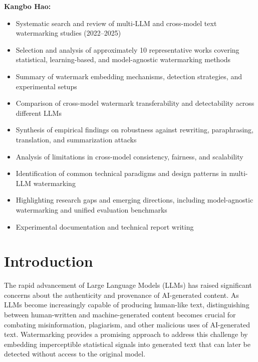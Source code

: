 \documentclass[12pt,letterpaper]{article}
\begin{document}
\vspace{0.5cm}
\noindent\textbf{Kangbo Hao:}
\begin{itemize}
    \item Systematic search and review of multi-LLM and cross-model text watermarking studies (2022--2025)
    \item Selection and analysis of approximately 10 representative works covering statistical, learning-based, and model-agnostic watermarking methods
    \item Summary of watermark embedding mechanisms, detection strategies, and experimental setups
    \item Comparison of cross-model watermark transferability and detectability across different LLMs
    \item Synthesis of empirical findings on robustness against rewriting, paraphrasing, translation, and summarization attacks
    \item Analysis of limitations in cross-model consistency, fairness, and scalability
    \item Identification of common technical paradigms and design patterns in multi-LLM watermarking
    \item Highlighting research gaps and emerging directions, including model-agnostic watermarking and unified evaluation benchmarks
    \item Experimental documentation and technical report writing
\end{itemize}

\newpage

\section{Introduction}

The rapid advancement of Large Language Models (LLMs) has raised significant concerns about the authenticity and provenance of AI-generated content. As LLMs become increasingly capable of producing human-like text, distinguishing between human-written and machine-generated content becomes crucial for combating misinformation, plagiarism, and other malicious uses of AI-generated text. Watermarking provides a promising approach to address this challenge by embedding imperceptible statistical signals into generated text that can later be detected without access to the original model.
\end{document}
